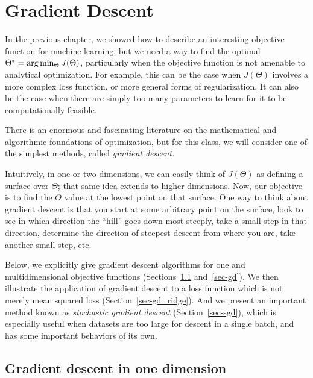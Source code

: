 \chapter{Gradient Descent}
\label{chap-gradient}
\vspace*{-0.1in}
In the previous chapter,
we showed how to describe an interesting objective function for
machine learning, but we need a way to
find the optimal $\Theta^* = {\rm arg}\min_{\Theta} J(\Theta)$, particularly
when the objective function is not amenable to analytical
optimization.  For example, this can be the case when $J(\Theta)$
involves a more complex loss function, or more general forms of
regularization.  
It can also be the case when there are simply too many
parameters to learn for it to be computationally feasible.

There is an
enormous and fascinating literature on the mathematical and algorithmic
foundations of optimization, but for this class, we will consider one of the simplest
methods, called {\em gradient descent.}

Intuitively, in one or two dimensions, we can easily think of
$J(\Theta)$ as defining a surface over $\Theta$;  that same idea
extends to higher dimensions.  Now, our objective is to find the
$\Theta$ value at the lowest point on that surface.  One way to think
about gradient descent is that you start at some arbitrary point on
the surface, look to see in which direction the ``hill'' goes down
most steeply, take a small step in that direction, determine the
direction of steepest descent from where you are, take another small
step, etc.

Below, we explicitly give gradient descent algorithms for one and
multidimensional objective functions (Sections~\ref{sec-gd_onedim}
and~\ref{sec-gd}).  We then illustrate the application of gradient
descent to a loss function which is not merely mean squared loss
(Section~\ref{sec-gd_ridge}).  And we present an important method known
as {\em stochastic gradient descent}
(Section~\ref{sec-sgd}), which is
especially useful when datasets are too large for descent in a single
batch, and has some important behaviors of its own.

\section{Gradient descent in one dimension}\label{sec-gd_onedim}

